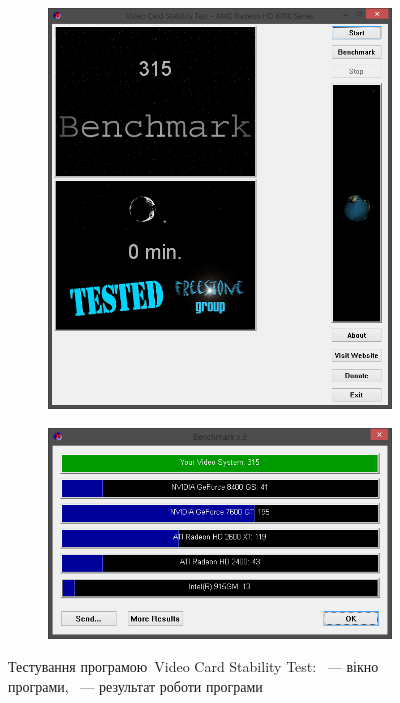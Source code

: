 \documentclass[
	a4paper,
	oneside,
	BCOR = 10mm,
	DIV = 12,
	12pt,
	headings = normal,
]{scrartcl}
\begin{document}
			\begin{figure}[!htbp]
				\centering
				\begin{subfigure}[t]{\columnwidth / 2}
					\centering
					\includegraphics[height=12\baselineskip]{./assets/y03s02-pcdiag-lab-04-p02-01-vcardstabtest-prerun.png}
					\caption{}
					\label{subfig:vcardstabtest-prerun}
				\end{subfigure}%
				\begin{subfigure}[t]{\columnwidth / 2}
					\centering
					\includegraphics[width=\columnwidth]{./assets/y03s02-pcdiag-lab-04-p02-02-vcardstabtest-res.png}
					\caption{}
					\label{subfig:vcardstabtest-res}
				\end{subfigure}%
				\caption{Тестування програмою~\textenglish{Video Card Stability Test}: ~— вікно програми, ~— результат роботи програми}
				\label{fig:vcardstabtest}
			\end{figure}
\end{document}
